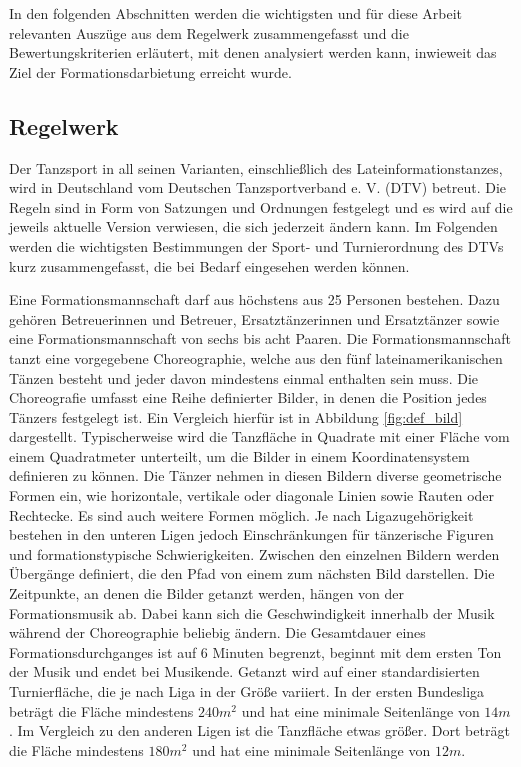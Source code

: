 \documentclass[
  ngerman,
  a4paper,  %
  twoside,  %
  bibliography=totoc,
  headsepline,
  cleardoublepage=empty,
  parskip=half,
  draft=false
]{scrbook}
\begin{document}
In den folgenden Abschnitten werden die wichtigsten und für diese Arbeit relevanten Auszüge aus dem Regelwerk zusammengefasst und die Bewertungskriterien erläutert, mit denen analysiert werden kann, inwieweit das Ziel der Formationsdarbietung erreicht wurde.




\subsection{Regelwerk}
Der Tanzsport in all seinen Varianten, einschließlich des Lateinformationstanzes, wird in Deutschland vom Deutschen Tanzsportverband e. V. (DTV) betreut.
Die Regeln sind in Form von Satzungen und Ordnungen festgelegt \cite{noauthor_tanzsport_nodate} und es wird auf die jeweils aktuelle Version verwiesen, die sich jederzeit ändern kann.
Im Folgenden werden die wichtigsten Bestimmungen der Sport- und Turnierordnung des DTVs kurz zusammengefasst, die bei Bedarf eingesehen werden können.

Eine Formationsmannschaft darf aus höchstens aus 25 Personen bestehen.
Dazu gehören Betreuerinnen und Betreuer, Ersatztänzerinnen und Ersatztänzer sowie eine Formationsmannschaft von sechs bis acht Paaren.
Die Formationsmannschaft tanzt eine vorgegebene Choreographie, welche aus den fünf lateinamerikanischen Tänzen besteht und jeder davon mindestens einmal enthalten sein muss.
Die Choreografie umfasst eine Reihe definierter Bilder, in denen die Position jedes Tänzers festgelegt ist.
Ein Vergleich hierfür ist in Abbildung \ref{fig:def_bild} dargestellt.
Typischerweise wird die Tanzfläche in Quadrate mit einer Fläche vom einem Quadratmeter unterteilt, um die Bilder in einem Koordinatensystem definieren zu können.
Die Tänzer nehmen in diesen Bildern diverse geometrische Formen ein, wie horizontale, vertikale oder diagonale Linien sowie Rauten oder Rechtecke.
Es sind auch weitere Formen möglich.
Je nach Ligazugehörigkeit bestehen in den unteren Ligen jedoch Einschränkungen für tänzerische Figuren und formationstypische Schwierigkeiten.
Zwischen den einzelnen Bildern werden Übergänge definiert, die den Pfad von einem zum nächsten Bild darstellen.
Die Zeitpunkte, an denen die Bilder getanzt werden, hängen von der Formationsmusik ab.
Dabei kann sich die Geschwindigkeit innerhalb der Musik während der Choreographie beliebig ändern.
Die Gesamtdauer eines Formationsdurchganges ist auf 6 Minuten begrenzt, beginnt mit dem ersten Ton der Musik und endet bei Musikende.
Getanzt wird auf einer standardisierten Turnierfläche, die je nach Liga in der Größe variiert.
In der ersten Bundesliga beträgt die Fläche mindestens $240 m^2$ und hat eine minimale Seitenlänge von $14 m$.
Im Vergleich zu den anderen Ligen ist die Tanzfläche etwas größer.
Dort beträgt die Fläche mindestens $180 m^2$ und hat eine minimale Seitenlänge von $12 m$.
\end{document}
